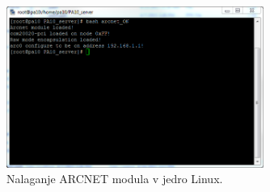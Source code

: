 \begin{figure}[!th]
	\centering
	\includegraphics[width=0.75\textwidth]{./Slike/linux-arcnetON.png}
	\caption{Nalaganje ARCNET modula v jedro Linux.}
	\label{fig:linux-arcnetON}
\end{figure}
